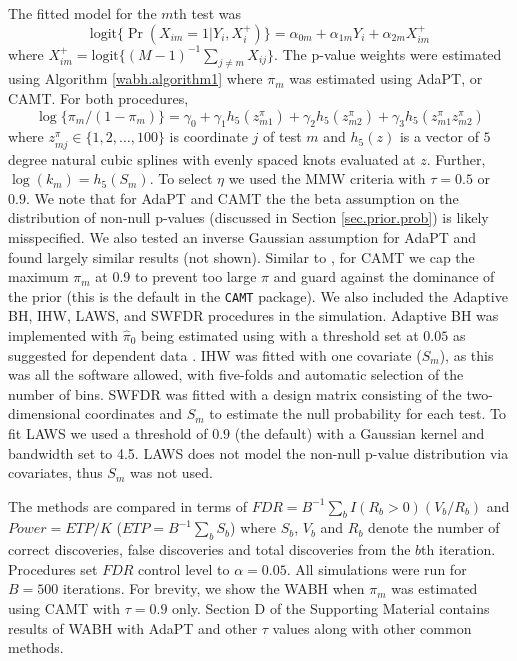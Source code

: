 \documentclass[bimj,fleqn]{w-art}
\theoremstyle{plain}
\theoremstyle{definition}
\begin{document}
The fitted model for the $m$th test was
%
$$\mbox{logit}\{\Pr(X_{im}=1|Y_i,X_{i}^+)\} = \alpha_{0m} + \alpha_{1m}Y_i + \alpha_{2m}X_{im}^+  $$
%
where $X_{im}^+ = \mbox{logit}\{(M-1)^{-1}\sum_{j \neq m} X_{ij}\}$. The p-value weights were estimated using Algorithm \ref{wabh.algorithm1} where $\pi_m$ was estimated using AdaPT, or CAMT. For both procedures, 
%
\begin{equation}\label{eq.pm.model}
\log\{\pi_m/(1-\pi_m)\} = \gamma_0  + \gamma_1 h_5(z_{m1}^\pi) + \gamma_2 h_5(z_{m2}^\pi) + \gamma_3 h_5(z_{m1}^\pi z_{m2}^\pi) 
\end{equation}
%
where $z_{mj}^\pi\in \{1,2,\ldots,100\}$ is coordinate $j$ of test $m$ and $h_5(z)$ is a vector of $5$ degree natural cubic splines with evenly spaced knots evaluated at $z$. Further, $\log(k_m) = h_5(S_m)$. To select $\eta$ we used the MMW criteria with $\tau = 0.5$ or $0.9$. We note that for AdaPT and CAMT the the beta assumption on the distribution of non-null p-values (discussed in Section \ref{sec.prior.prob}) is likely misspecified. We also tested an inverse Gaussian assumption for AdaPT and found largely similar results (not shown). Similar to \cite{Xianyang20}, for CAMT we cap the maximum $\pi_m$ at 0.9 to prevent too large $\pi$ and guard against the dominance of the prior (this is the default in the \texttt{CAMT} package). We also included the Adaptive BH, IHW, LAWS, and SWFDR procedures in the simulation. Adaptive BH was implemented with $\hat\pi_0$ being estimated using \cite{Sto07} with a threshold set at $0.05$ as suggested for dependent data \citep{Blanchard2009}. IHW was fitted with one covariate ($S_m$), as this was all the software allowed, with five-folds and automatic selection of the number of bins. SWFDR was fitted with a design matrix consisting of the two-dimensional coordinates and $S_m$ to estimate the null probability for each test. To fit LAWS we used a threshold of $0.9$ (the default) with a Gaussian kernel and bandwidth set to 4.5. LAWS does not model the non-null p-value distribution via covariates, thus $S_m$ was not used.

The methods are compared in terms of $FDR = B^{-1}\sum_b I(R_b>0)(V_b/R_b)$ and $Power = ETP/K$ ($ETP = B^{-1} \sum_b S_b$) where $S_b$, $V_b$ and $R_b$ denote the number of correct discoveries, false discoveries and total discoveries from the $b$th iteration. Procedures set $FDR$ control level to $\alpha=0.05$. All simulations were run for $B=500$ iterations.  For brevity, we show the WABH when $\pi_m$ was estimated using CAMT with $\tau=0.9$ only. Section D of the Supporting Material contains results of WABH with AdaPT and other $\tau$ values along with other common methods. 
\end{document}
